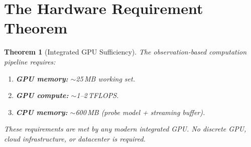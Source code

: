 \documentclass[11pt,twocolumn,a4paper]{article}
\newtheorem{theorem}{Theorem}[section]
\begin{document}

\section{The Hardware Requirement Theorem}
\label{sec:hardware}

\begin{theorem}[Integrated GPU Sufficiency]
\label{thm:hardware}
The observation-based computation pipeline requires:
\begin{enumerate}[label=(\roman*),leftmargin=*]
\item \textbf{GPU memory:} $\sim$25\,MB working set.
\item \textbf{GPU compute:} $\sim$1--2\,TFLOPS.
\item \textbf{CPU memory:} $\sim$600\,MB (probe model + streaming
  buffer).
\end{enumerate}
These requirements are met by any modern integrated GPU. No discrete
GPU, cloud infrastructure, or datacenter is required.
\end{theorem}
\end{document}
